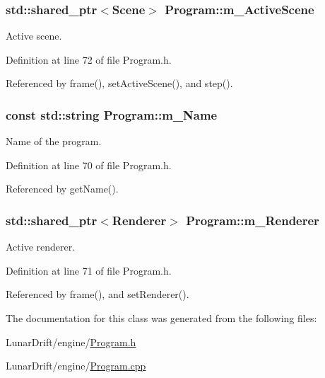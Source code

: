 \subsubsection[{\texorpdfstring{m\+\_\+\+Active\+Scene}{m_ActiveScene}}]{\setlength{\rightskip}{0pt plus 5cm}std\+::shared\+\_\+ptr$<${\bf Scene}$>$ Program\+::m\+\_\+\+Active\+Scene\hspace{0.3cm}{\ttfamily [private]}}\hypertarget{class_program_a261d54bdb11938ff460af06232f8580f}{}\label{class_program_a261d54bdb11938ff460af06232f8580f}


Active scene. 



Definition at line 72 of file Program.\+h.



Referenced by frame(), set\+Active\+Scene(), and step().

\subsubsection[{\texorpdfstring{m\+\_\+\+Name}{m_Name}}]{\setlength{\rightskip}{0pt plus 5cm}const std\+::string Program\+::m\+\_\+\+Name\hspace{0.3cm}{\ttfamily [private]}}\hypertarget{class_program_a69d3c5c15cf8167d59e4d8c25e915063}{}\label{class_program_a69d3c5c15cf8167d59e4d8c25e915063}


Name of the program. 



Definition at line 70 of file Program.\+h.



Referenced by get\+Name().

\subsubsection[{\texorpdfstring{m\+\_\+\+Renderer}{m_Renderer}}]{\setlength{\rightskip}{0pt plus 5cm}std\+::shared\+\_\+ptr$<${\bf Renderer}$>$ Program\+::m\+\_\+\+Renderer\hspace{0.3cm}{\ttfamily [private]}}\hypertarget{class_program_a0aaeb79e919a8009806510e5dca10f50}{}\label{class_program_a0aaeb79e919a8009806510e5dca10f50}


Active renderer. 



Definition at line 71 of file Program.\+h.



Referenced by frame(), and set\+Renderer().



The documentation for this class was generated from the following files\+:\begin{DoxyCompactItemize}
\item 
Lunar\+Drift/engine/\hyperlink{_program_8h}{Program.\+h}\item 
Lunar\+Drift/engine/\hyperlink{_program_8cpp}{Program.\+cpp}\end{DoxyCompactItemize}
